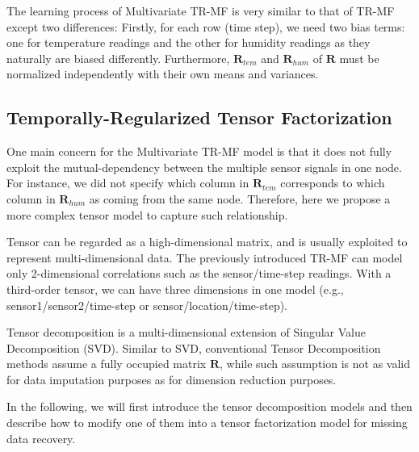 The learning process of Multivariate TR-MF is very similar to that of TR-MF except two differences:
Firstly, for each row (time step), we need two bias terms: one for temperature readings and the other for humidity readings as they naturally are biased differently. Furthermore, $\mathbf{R}_{tem}$ and $\mathbf{R}_{hum}$ of $\mathbf{R}$ must be normalized independently with their own means and variances. 

 
\subsection{Temporally-Regularized Tensor Factorization} \label{sec:tensordecomp}

One main concern for the Multivariate TR-MF model is that it does not fully exploit the mutual-dependency between the multiple sensor signals in one node. For instance, we did not specify which column in $\mathbf{R}_{tem}$ corresponds to which column in $\mathbf{R}_{hum}$ as coming from the same node. Therefore, here we propose a more complex tensor model to capture such relationship. 

Tensor can be regarded as a high-dimensional matrix, and is usually exploited to represent multi-dimensional data. The previously introduced TR-MF can model only 2-dimensional correlations such as the sensor/time-step readings. With a third-order tensor, we can have three dimensions in one model (e.g., sensor1/sensor2/time-step or sensor/location/time-step).%

Tensor decomposition is a multi-dimensional extension of Singular Value Decomposition (SVD). Similar to SVD, conventional Tensor Decomposition methods assume a fully occupied matrix $\mathbf{R}$, while such assumption is not as valid for data imputation purposes as for dimension reduction purposes.

In the following, we will first introduce the tensor decomposition models and then describe how to modify one of them into a tensor factorization model for missing data recovery. 

 
